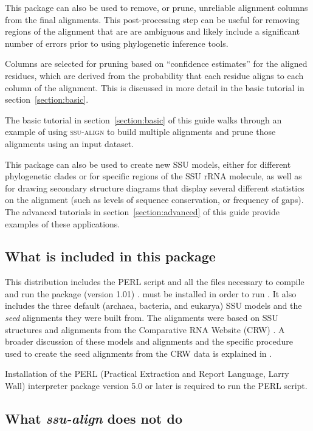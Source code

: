 This package can also be used to remove, or prune, unreliable
alignment columns from the final alignments.  This post-processing
step can be useful for removing regions of the alignment that are
are ambiguous and likely include a significant number of errors prior
to using phylogenetic inference tools.

Columns are selected for pruning based on ``confidence estimates'' 
for the aligned residues, which are derived from the probability that
each residue aligns to each column of the alignment. This is discussed
in more detail in the basic tutorial in section~\ref{section:basic}.

The basic tutorial in section~\ref{section:basic} of this guide walks
through an example of using \textsc{ssu-align} to build multiple
alignments and prune those alignments using an input dataset.

This package can also be used to create new SSU models, either for
different phylogenetic clades or for specific regions of the SSU rRNA
molecule, as well as for drawing secondary structure diagrams that
display several different statistics on the alignment (such as levels
of sequence conservation, or frequency of gaps). The advanced
tutorials in section~\ref{section:advanced} of this guide provide
examples of these applications.

\subsection{What is included in this package}

This distribution includes the PERL script  and
all the files necessary to compile and run the 
package (version 1.01) \cite{Nawrocki09}.  must be
installed in order to run .  It also includes the
three default (archaea, bacteria, and eukarya) SSU models and the
\emph{seed} alignments they were built from. The alignments were based
on SSU structures and alignments from the Comparative RNA Website
(CRW) \cite{Cannone02}. A broader discussion of these models and
alignments and the specific procedure used to create the seed
alignments from the CRW data is explained in \cite{Nawrocki09b}.

Installation of the PERL (Practical Extraction and Report Language,
Larry Wall) interpreter package version 5.0 or later is required to
run the  PERL script.

\subsection{What \emph{ssu-align} does not do}

